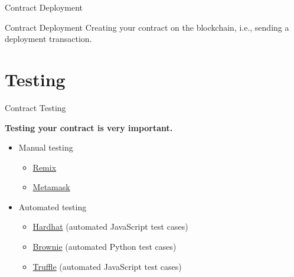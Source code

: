 \documentclass[]{beamer}
\begin{document}
\begin{frame}{Contract Deployment}
		
	\begin{keytakeaway}{Contract Deployment}
		Creating your contract on the blockchain, i.e., sending a deployment transaction.
	\end{keytakeaway}
	
	\vspace{1.5em}
\end{frame}


\section{Testing}

\begin{frame}{Contract Testing}
		
	\textbf{Testing your contract is very important.}\\
	
	\begin{itemize}
		\item<2-> Manual testing
		\begin{itemize}
			\item<2-> \href{https://remix.ethereum.org/}{\link Remix}
			\item<2-> \href{https://metamask.io}{\link Metamask}
		\end{itemize}
		\item<3-> Automated testing
		\begin{itemize}
			\item<3-> \href{https://hardhat.org/}{\link Hardhat} (automated JavaScript test cases)
			\item<3-> \href{https://github.com/eth-brownie/brownie}{\link Brownie} (automated Python test cases)
			\item<3-> \href{https://www.trufflesuite.com/truffle}{\link Truffle} (automated JavaScript test cases)
		\end{itemize}
	\end{itemize}
\end{frame}

%	
%	
\end{document}
